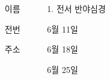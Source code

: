 \documentclass[	25pt, 
							a0paper, 
							landscape, %
							margin=0mm, %
							innermargin=10mm,  		%
							colspace=5mm, 
							subcolspace=0mm
							]{tikzposter}
\begin{document}
\begin{columns}
{			\begin{LARGE}
			\begin{itemize}
			\item [이름]
			\item [전번]
			\item [주소] 
			\end{itemize}
			\end{LARGE}

		}




			{				
			\setlength{\leftmargini}{9em}			
			\setlength{\labelsep}{1em} %

			\begin{LARGE}
			\begin{itemize}
			\item [1.] 전서 반야심경
			\item [6월 11일]
			\item [6월 18일]
			\item [6월 25일]
			\end{itemize}
			\end{LARGE}
		}





	\end{columns}
\end{document}
